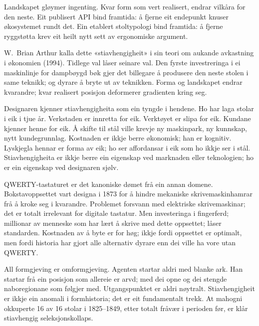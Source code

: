 
Landskapet gløymer ingenting. Kvar form som vert realisert, endrar vilkåra for den neste. Eit publisert API bind framtida: å fjerne eit endepunkt knuser økosystemet rundt det. Ein etablert stoltypologi bind framtida: å fjerne ryggstøtta krev eit heilt nytt sett av ergonomiske argument.

W.~Brian Arthur kalla dette «stiavhengigheit» i sin teori om aukande avkastning i økonomien (1994). Tidlege val låser seinare val. Den fyrste investreringa i ei maskinlinje for dampbøygd bøk gjer det billegare å produsere den neste stolen i same teknikk; og dyrare å bryte ut av teknikken. Forma og landskapet endrar kvarandre; kvar realisert posisjon deformerer gradienten kring seg.

Designaren kjenner stiavhengigheita som ein tyngde i hendene. Ho har laga stolar i eik i tjue år. Verkstaden er innretta for eik. Verktøyet er slipa for eik. Kundane kjenner henne for eik. Å skifte til stål ville krevje ny maskinpark, ny kunnskap, nytt kundegrunnlag. Kostnaden er ikkje berre økonomisk; han er kognitiv. Lyskjegla hennar er forma av eik; ho ser affordansar i eik som ho ikkje ser i stål. Stiavhengigheita er ikkje berre ein eigenskap ved marknaden eller teknologien; ho er ein eigenskap ved designaren sjølv.

QWERTY-tastaturet er det kanoniske dømet frå ein annan domene. Bokstavoppsettet vart designa i 1873 for å hindre mekaniske skrivemaskinhamrar frå å kroke seg i kvarandre. Problemet forsvann med elektriske skrivemaskinar; det er totalt irrelevant for digitale tastatur. Men investeringa i fingerferd; millionar av menneske som har lært å skrive med dette oppsettet; låser standarden. Kostnaden av å byte er for høg; ikkje fordi oppsettet er optimalt, men fordi historia har gjort alle alternativ dyrare enn dei ville ha vore utan QWERTY.

All formgjeving er omformgjeving. Agenten startar aldri med blanke ark. Han startar frå ein posisjon som allereie er arvd; med dei opne og dei stengde naboregionane som følgjer med. Utgangspunktet er aldri nøytralt. Stiavhengigheit er ikkje ein anomali i formhistoria; det er eit fundamentalt trekk. At mahogni okkuperte 16 av 16 stolar i 1825--1849, etter totalt fråvær i perioden før, er klår stiavhengig seleksjonskollaps.

